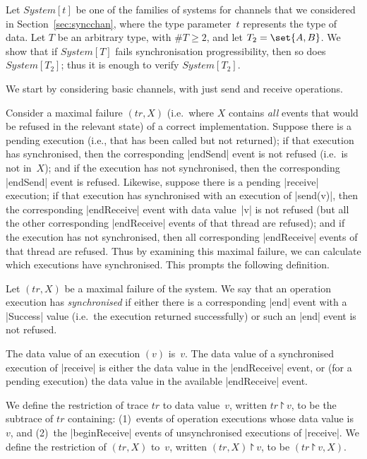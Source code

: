 Let $System[t]$ be one of the families of systems for channels that we
considered in Section~\ref{sec:syncchan}, where the type parameter~$t$
represents the type of data.  Let $T$ be an arbitrary type, with $\#T \ge 2$,
and let $T_2 = \set{A,B}$.  We show that if $System[T]$ fails synchronisation
progressibility, then so does $System[T_2]$; thus it is enough to verify
$System[T_2]$.

We start by considering basic channels, with just send and receive
operations. 

Consider a maximal failure $(tr,X)$ (i.e.~where $X$ contains \emph{all} events
that would be refused in the relevant state) of a correct implementation.
Suppose there is a pending  execution (i.e., that has been called
but not returned); if that execution has synchronised, then the corresponding
|endSend| event is not refused (i.e.~is not in~$X$); and if the execution has
not synchronised, then the corresponding |endSend| event is refused.
Likewise, suppose there is a pending |receive| execution; if that execution
has synchronised with an execution of |send(v)|, then the corresponding
|endReceive| event with data value~|v| is not refused (but all the other
corresponding |endReceive| events of that thread are refused); and if the
execution has not synchronised, then all corresponding |endReceive| events of
that thread are refused.  Thus by examining this maximal failure, we can
calculate which executions have synchronised.  This prompts the following
definition.
%
\begin{definition}
\label{def:synchronised}
Let $(tr,X)$ be a maximal failure of the system.  We say that an operation
execution has \emph{synchronised} if either there is a corresponding |end|
event with a |Success| value (i.e.~the execution returned successfully) or
such an |end| event is not refused.

The data value of an execution $(v)$ is~$v$.  The data value of a
synchronised execution of |receive| is either the data value in the
|endReceive| event, or (for a pending execution) the data value in the
available |endReceive| event.
\end{definition}

\begin{definition}
\label{def:project}
We define the restriction of trace $tr$ to data value~$v$, written $tr
\project v$, to be the subtrace of $tr$ containing: (1)~events of operation
executions whose data value is~$v$, and (2)~the |beginReceive| events of
unsynchronised executions of |receive|.  We define the restriction of
$(tr,X)$ to~$v$, written $(tr,X) \project v$, to be $(tr \project v, X)$.
\end{definition}

